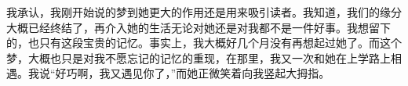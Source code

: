 \documentclass[UTF8,oneside]{ctexbook}
\begin{document}
我承认，我刚开始说的梦到她更大的作用还是用来吸引读者。我知道，我们的缘分大概已经终结了，再介入她的生活无论对她还是对我都不是一件好事。我想留下的，也只有这段宝贵的记忆。事实上，我大概好几个月没有再想起过她了。而这个梦，大概也只是对我不愿忘记的记忆的重现，在那里，我又一次和她在上学路上相遇。我说``好巧啊，我又遇见你了，''而她正微笑着向我竖起大拇指。
\end{document}

